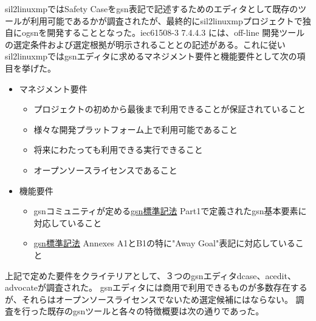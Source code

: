 \par
\acrshort{sil2linuxmp}ではSafety Caseを\acrshort{gsn}表記で記述するためのエディタとして既存のツールが利用可能であるかが調査されたが、最終的に\acrshort{sil2linuxmp}プロジェクトで独自に\gls{ogsn}を開発することとなった。\acrshort{iec61508}-3 7.4.4.3 には、off-line 開発ツールの選定条件および選定根拠が明示されることとの記述がある。これに従い\acrshort{sil2linuxmp}では\acrshort{gsn}エディタに求めるマネジメント要件と機能要件として次の項目を挙げた。
\begin{itemize}
  \item マネジメント要件
  \begin{itemize}
    \item プロジェクトの初めから最後まで利用できることが保証されていること
    \item 様々な開発プラットフォーム上で利用可能であること
    \item 将来にわたっても利用できる実行できること
    \item オープンソースライセンスであること
  \end{itemize}
  \item 機能要件
  \begin{itemize}
    \item \acrshort{gsn}コミュニティが定める\href{http://www.goalstructuringnotation.info/documents/GSN\_Standard.pdf}{\acrshort{gsn}標準記法} \cite{gsn} Part1で定義された\acrshort{gsn}基本要素に対応していること
    \item \href{http://www.goalstructuringnotation.info/documents/GSN\_Standard.pdf}{\acrshort{gsn}標準記法} \cite{gsn} Annexes A1とB1の特に"Away Goal"表記に対応していること
  \end{itemize}
\end{itemize}
\par
上記で定めた要件をクライテリアとして、３つの\acrshort{gsn}エディタ\acrshort{dcase}、\acrshort{acedit}、\acrshort{advocate}が調査された。
\acrshort{gsn}エディタには商用で利用できるものが多数存在するが、それらはオープンソースライセンスでないため選定候補にはならない。
調査を行った既存の\acrshort{gsn}ツールと各々の特徴概要は次の通りであった。
